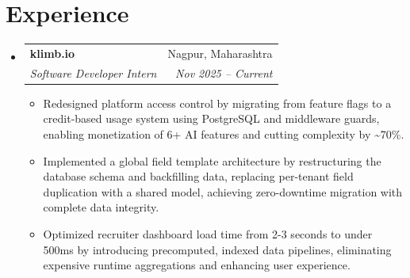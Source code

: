 \documentclass[letterpaper,10pt]{article}
\makeatletter
\newenvironment{resumeList}{
  \begin{itemize}[leftmargin=0.15in, label={}]
}{
  \end{itemize}
}
\newcommand{\resumeItem}[1]{
  \item\small{
    {#1 \vspace{-2.5pt}}
  }
}
\newcommand{\resumeSubheading}[4]{
  \vspace{-2pt}\item
    \begin{tabular*}{0.97\textwidth}[t]{l@{\extracolsep{\fill}}r}
      \textbf{#1} & #2 \\
      \textit{\small#3} & \textit{\small #4} \\
    \end{tabular*}\vspace{-6pt}
}
\newcommand{\resumeItemListStart}{\begin{itemize}[leftmargin=0.15in]}
\newcommand{\resumeItemListEnd}{\end{itemize}\vspace{-5pt}}
\makeatother
\begin{document}
\section{Experience}
\begin{resumeList}
    \resumeSubheading
    {klimb.io}{Nagpur, Maharashtra}
    {Software Developer Intern}{Nov 2025 – Current}
  \resumeItemListStart
    \resumeItem{Redesigned platform access control by migrating from feature flags to a credit-based usage system using PostgreSQL and middleware guards, enabling monetization of 6+ AI features and cutting complexity by \textasciitilde{}70\%.}
    \resumeItem{Implemented a global field template architecture by restructuring the database schema and backfilling data, replacing per-tenant field duplication with a shared model, achieving zero-downtime migration with complete data integrity.}
    \resumeItem{Optimized recruiter dashboard load time from 2-3 seconds to under 500ms by introducing precomputed, indexed data pipelines, eliminating expensive runtime aggregations and enhancing user experience.}
  \resumeItemListEnd
\end{resumeList}

\end{document}
